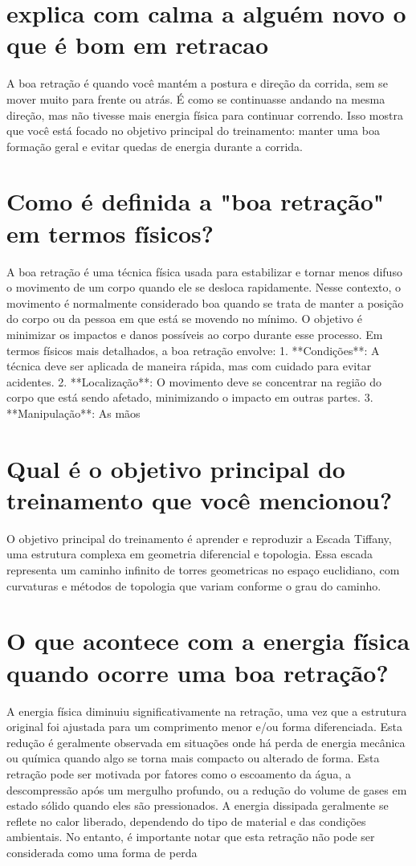 \documentclass[11pt,a4paper]{article}
\begin{document}
\section{explica com calma a alguém novo o que é bom em retracao}
A boa retração é quando você mantém a postura e direção da corrida, sem se mover muito para frente ou atrás. É como se continuasse andando na mesma direção, mas não tivesse mais energia física para continuar correndo. Isso mostra que você está focado no objetivo principal do treinamento: manter uma boa formação geral e evitar quedas de energia durante a corrida.

\section{Como é definida a "boa retração" em termos físicos?}
A boa retração é uma técnica física usada para estabilizar e tornar menos difuso o movimento de um corpo quando ele se desloca rapidamente. Nesse contexto, o movimento é normalmente considerado boa quando se trata de manter a posição do corpo ou da pessoa em que está se movendo no mínimo. O objetivo é minimizar os impactos e danos possíveis ao corpo durante esse processo. Em termos físicos mais detalhados, a boa retração envolve: 1. **Condições**: A técnica deve ser aplicada de maneira rápida, mas com cuidado para evitar acidentes. 2. **Localização**: O movimento deve se concentrar na região do corpo que está sendo afetado, minimizando o impacto em outras partes. 3. **Manipulação**: As mãos

\section{Qual é o objetivo principal do treinamento que você mencionou?}
O objetivo principal do treinamento é aprender e reproduzir a Escada Tiffany, uma estrutura complexa em geometria diferencial e topologia. Essa escada representa um caminho infinito de torres geometricas no espaço euclidiano, com curvaturas e métodos de topologia que variam conforme o grau do caminho.

\section{O que acontece com a energia física quando ocorre uma boa retração?}
A energia física diminuiu significativamente na retração, uma vez que a estrutura original foi ajustada para um comprimento menor e/ou forma diferenciada. Esta redução é geralmente observada em situações onde há perda de energia mecânica ou química quando algo se torna mais compacto ou alterado de forma. Esta retração pode ser motivada por fatores como o escoamento da água, a descompressão após um mergulho profundo, ou a redução do volume de gases em estado sólido quando eles são pressionados. A energia dissipada geralmente se reflete no calor liberado, dependendo do tipo de material e das condições ambientais. No entanto, é importante notar que esta retração não pode ser considerada como uma forma de perda
\end{document}
